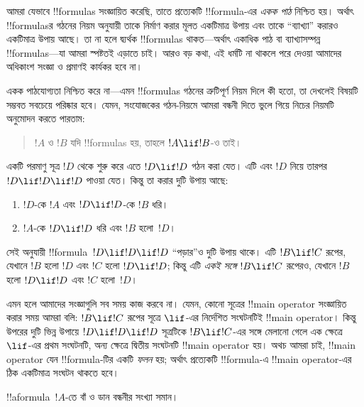 \documentclass[../../../include/open-logic-section]{subfiles}
\begin{document}


\begin{explain}
আমরা যেভাবে !!{formula}s সংজ্ঞায়িত করেছি, তাতে প্রত্যেকটি !!{formula}-এর
\emph{একক পাঠ} নিশ্চিত হয়। অর্থাৎ !!{formula}sর গঠনের নিয়ম অনুযায়ী
তাকে নির্মাণ করার মূলত একটিমাত্র উপায় এবং তাকে “ব্যাখ্যা” করারও একটিমাত্র
উপায় আছে। তা না হলে দ্ব্যর্থক !!{formula}s থাকত—অর্থাৎ একাধিক পাঠ বা
ব্যাখ্যাসম্পন্ন !!{formula}s—যা আমরা স্পষ্টতই এড়াতে চাই। আরও বড় কথা,
এই ধর্মটি না থাকলে পরে দেওয়া আমাদের অধিকাংশ সংজ্ঞা ও প্রমাণই কার্যকর
হবে না।

একক পাঠযোগ্যতা নিশ্চিত করে না—এমন !!{formula}s গঠনের ত্রুটিপূর্ণ নিয়ম
দিলে কী হতো, তা দেখলেই বিষয়টি সম্ভবত সবচেয়ে পরিষ্কার হবে। যেমন, সংযোজকের গঠন-নিয়মে
আমরা বন্ধনী দিতে ভুলে গিয়ে নিচের নিয়মটি অনুমোদন করতে পারতাম:
\begin{quote}
$!A$ ও $!B$ যদি !!{formula}s হয়, তাহলে $!A \lif !B$-ও তাই।
\end{quote}
একটি পরমাণু সূত্র $!D$ থেকে শুরু করে এতে $!D \lif !D$ গঠন করা যেত।
এটি এবং $!D$ নিয়ে তারপর $!D \lif !D \lif !D$ পাওয়া যেত। কিন্তু তা
করার দুটি উপায় আছে:
\begin{enumerate}
\item $!D$-কে $!A$ এবং $!D \lif !D$-কে $!B$ ধরি।
\item $!A$-কে $!D \lif !D$ ধরি এবং $!B$ হলো~$!D$।
\end{enumerate}
সেই অনুযায়ী !!{formula}~$!D \lif !D \lif !D$ “পড়ার”ও দুটি উপায়
থাকে। এটি $!B \lif !C$ রূপের, যেখানে $!B$ হলো $!D$ এবং $!C$ হলো
$!D \lif !D$; কিন্তু এটি \emph{একই সঙ্গে} $!B \lif !C$ রূপেরও,
যেখানে $!B$ হলো $!D \lif !D$ এবং $!C$ হলো~$!D$।

এমন হলে আমাদের সংজ্ঞাগুলি সব সময় কাজ করবে না। যেমন, কোনো সূত্রের
!!{main operator} সংজ্ঞায়িত করার সময় আমরা বলি: $!B \lif !C$ রূপের
সূত্রে $\lif$-এর নির্দেশিত সংঘটনটিই !!{main operator}। কিন্তু উপরের
দুটি ভিন্ন উপায়ে $!D \lif !D \lif !D$ সূত্রটিকে $!B \lif !C$-এর
সঙ্গে মেলানো গেলে এক ক্ষেত্রে $\lif$-এর প্রথম সংঘটনটি, অন্য ক্ষেত্রে
দ্বিতীয় সংঘটনটি !!{main operator} হয়। অথচ আমরা চাই, !!{main operator}
যেন !!{formula}-টির একটি \emph{ফলন} হয়; অর্থাৎ প্রত্যেকটি !!{formula}-এ
!!{main operator}-এর ঠিক একটিমাত্র সংঘটন থাকতে হবে।
\end{explain}

\begin{lem}
!!a{formula}~$!A$-তে বাঁ ও ডান বন্ধনীর সংখ্যা সমান।
\end{lem}
\end{document}
